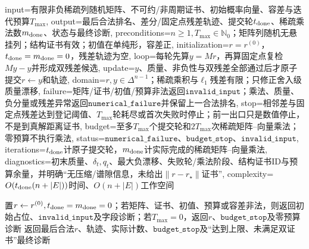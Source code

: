 \begin{AlgorithmContract}{
  input={有限非负稀疏列随机矩阵、不可约/非周期证书、初始概率向量、容差与迭代预算$T_{\max}$},
  output={最后合法排名、差分/固定点残差轨迹、提交轮$t_{\rm done}$、稀疏乘法数$m_{\rm done}$、状态与最终诊断},
  preconditions={$n\ge1,T_{\max}\in\mathbb N_0$；矩阵列随机无悬挂列；结构证书有效；初值在单纯形，容差正},
  initialization={$r=r^{(0)}$，$t_{\rm done}=m_{\rm done}=0$，残差轨迹为空},
  loop={每轮先算$y=Mr$，再算固定点复检$My-y$并形成双残差候选},
  update={$y$、质量、非负性与双残差全部通过后才原子提交$r\leftarrow y$和轨迹},
  domain={$r,y\in\Delta^{n-1}$；稀疏乘积与$\ell_1$残差有限；只修正舍入级质量漂移},
  failure={矩阵/证书/初值/预算非法返回$\mathtt{invalid\_input}$；乘法、质量、负分量或残差异常返回$\mathtt{numerical\_failure}$并保留上一合法排名},
  stop={相邻差与固定点残差达到登记阈值、$T_{\max}$轮耗尽或首次失败时停止；前一出口只是数值停止，不是到真解距离证书},
  budget={至多$T_{\max}$个提交轮和$2T_{\max}$次稀疏矩阵--向量乘法；零预算不执行乘法},
  status={$\mathtt{numerical\_failure}$、$\mathtt{budget\_stop}$、$\mathtt{invalid\_input}$},
  iterations={$t_{\rm done}$计原子提交轮，$m_{\rm done}$计实际完成的稀疏矩阵--向量乘法},
  diagnostics={初末质量、$\delta_t,q_t$、最大负漂移、失败轮/乘法阶段、结构证书ID与预算余量，并明确“无压缩/谱隙信息，未给出$\|r-r_\star\|$证书”},
  complexity={$O(t_{\rm done}(n+|E|))$时间、$O(n+|E|)$工作空间}
}
\begin{algorithm}[tbp]
\caption{基本\PageRank{}的稀疏幂迭代}\label{alg:V5-C07-basic-power}
置$r\leftarrow r^{(0)},t_{\rm done}=m_{\rm done}=0$；若矩阵、证书、初值、预算或容差非法，则返回初始占位、$\mathtt{invalid\_input}$及字段诊断；若$T_{\max}=0$，返回$r$、$\mathtt{budget\_stop}$及零预算诊断\;
返回最后合法$r$、轨迹、实际计数、$\mathtt{budget\_stop}$及“达到上限、未满足双证书”最终诊断\;
\end{algorithm}
\end{AlgorithmContract}
\endgroup

